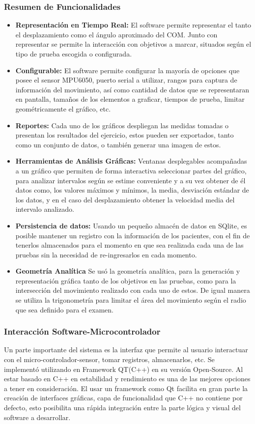\documentclass[12pt,a4paper]{article}
\begin{document}
\subsubsection{Resumen de Funcionalidades}
\begin{itemize}
	\item \textbf{Representación en Tiempo Real:} El software permite representar el tanto el desplazamiento como el ángulo aproximado del COM.
	Junto con representar se permite la interacción con objetivos a marcar, situados según el tipo de prueba escogida o configurada.
	\item \textbf{Configurable:} El software permite configurar la mayoría de opciones que posee el sensor MPU6050, puerto serial a utilizar, rangos para captura de información del movimiento, así como cantidad de datos que se representaran en pantalla, tamaños de los elementos a graficar, tiempos de prueba, limitar geométricamente el gráfico, etc.
	\item \textbf{Reportes:} Cada uno de los gráficos despliegan las medidas tomadas o presentan los resultados del ejercicio, estos pueden ser exportados, tanto como un conjunto de datos, o también generar una imagen de estos.
	\item \textbf{Herramientas de Análisis Gráficas:} Ventanas desplegables acompañadas a un gráfico que permiten de forma interactiva seleccionar partes del gráfico, para analizar intervalos según se estime conveniente y a su vez obtener de él datos como, los valores máximos y mínimos, la media, desviación estándar de los datos, y en el caso del desplazamiento obtener la velocidad media del intervalo analizado.
	\item \textbf{Persistencia de datos:} Usando un pequeño almacén de datos en SQlite, es posible mantener un registro con la información de los pacientes, con el fin de tenerlos almacenados para el momento en que sea realizada cada una de las pruebas sin la necesidad de re-ingresarlos en cada momento.
	\item \textbf{Geometría Analítica} Se usó la geometría analítica, para la generación y representación gráfica tanto de los objetivos en las pruebas, como para la intersección del movimiento realizado con cada uno de estos. De igual manera se utiliza la trigonometría para limitar el área del movimiento según el radio que sea definido para el examen.
\end{itemize}
\newpage
\subsubsection{Interacción Software-Microcontrolador}
Un parte importante del sistema es la interfaz que permite al usuario interactuar con el micro-controlador-sensor, tomar registros, almacenarlos, etc.
Se implementó utilizando en Framework QT(C++) \cite{QT} en su versión Open-Source.
Al estar basado en C++ en estabilidad y rendimiento es una de las mejores opciones a tener en consideración.
El usar un framework como Qt facilita en gran parte la creación de interfaces gráficas, capa de funcionalidad que C++ no contiene por defecto, esto posibilita una rápida integración entre la parte lógica y visual del software a desarrollar.
\end{document}
